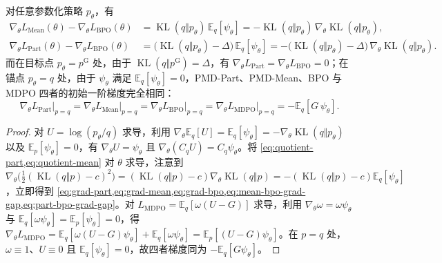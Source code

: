 \documentclass[lang=cn,scheme=chinese,openany]{../book/elegantbook}
\newcommand{\E}{\mathbb E}
\newcommand{\KL}{\operatorname{KL}}
\begin{document}
\begin{proposition}
\label{prop:ch2-bpo-part-gradient-gap}
对任意参数化策略 $p_\theta$，有
\begin{align}
 \nabla_\theta L_{\mathrm{Mean}}(\theta)-\nabla_\theta L_{\mathrm{BPO}}(\theta)
 &= \KL(q\Vert p_\theta)\,\E_q[\psi_\theta]
 = -\KL(q\Vert p_\theta)\,\nabla_\theta\KL(q\Vert p_\theta), \label{eq:mean-bpo-grad-gap}\\
 \nabla_\theta L_{\mathrm{Part}}(\theta)-\nabla_\theta L_{\mathrm{BPO}}(\theta)
 &= \bigl(\KL(q\Vert p_\theta)-\Delta\bigr)\,\E_q[\psi_\theta]
 = -\bigl(\KL(q\Vert p_\theta)-\Delta\bigr)\,\nabla_\theta\KL(q\Vert p_\theta). \label{eq:part-bpo-grad-gap}
\end{align}
而在目标点 $p_\theta=p^{\mathrm G}$ 处，由于 $\KL(q\Vert p^{\mathrm G})=\Delta$，有 $\nabla_\theta L_{\mathrm{Part}}=\nabla_\theta L_{\mathrm{BPO}}=0$；在锚点 $p_\theta=q$ 处，由于 $\psi_\theta$ 满足 $\E_q[\psi_\theta]=0$，PMD-Part、PMD-Mean、BPO 与 MDPO 四者的初始一阶梯度完全相同：
\begin{equation}
 \nabla_\theta L_{\mathrm{Part}}\big|_{p=q}
 =\nabla_\theta L_{\mathrm{Mean}}\big|_{p=q}
 =\nabla_\theta L_{\mathrm{BPO}}\big|_{p=q}
 =\nabla_\theta L_{\mathrm{MDPO}}\big|_{p=q}
 =-\E_q[G\,\psi_\theta].
 \label{eq:anchor-common-gradient}
\end{equation}
\end{proposition}
\begin{proof}
对 $U=\log(p_\theta/q)$ 求导，利用 $\nabla_\theta\E_q[U]=\E_q[\psi_\theta]=-\nabla_\theta\KL(q\Vert p_\theta)$ 以及 $\E_p[\psi_\theta]=0$，有 $\nabla_\theta U=\psi_\theta$ 且 $\nabla_\theta(C_q U)=C_q\psi_\theta$。将 \cref{eq:quotient-part,eq:quotient-mean} 对 $\theta$ 求导，注意到 $\nabla_\theta\bigl(\frac12(\KL(q\Vert p)-c)^2\bigr)=(\KL(q\Vert p)-c)\nabla_\theta\KL(q\Vert p)=-(\KL(q\Vert p)-c)\E_q[\psi_\theta]$，立即得到 \cref{eq:grad-part,eq:grad-mean,eq:grad-bpo,eq:mean-bpo-grad-gap,eq:part-bpo-grad-gap}。对 $L_{\mathrm{MDPO}}=\E_q[\omega(U-G)]$ 求导，利用 $\nabla_\theta\omega=\omega\psi_\theta$ 与 $\E_q[\omega\psi_\theta]=\E_p[\psi_\theta]=0$，得 $\nabla_\theta L_{\mathrm{MDPO}}=\E_q[\omega(U-G)\psi_\theta]+\E_q[\omega\psi_\theta]= \E_p[(U-G)\psi_\theta]$。在 $p=q$ 处，$\omega\equiv 1$、$U\equiv 0$ 且 $\E_q[\psi_\theta]=0$，故四者梯度同为 $-\E_q[G\psi_\theta]$。
\end{proof}
\end{document}
